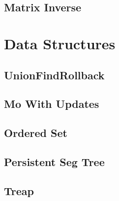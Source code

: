 \subsection{Matrix Inverse}
\vspace{-2.3ex}
\raggedbottom
\vspace{-3.3ex}
\hrulefill

\section{Data Structures}
\vspace{-1ex}
\subsection{UnionFindRollback}
\vspace{-2.3ex}
\raggedbottom
\vspace{-3.3ex}
\hrulefill
\vspace{-1ex}
\subsection{Mo With Updates}
\vspace{-2.3ex}
\raggedbottom
\vspace{-3.3ex}
\hrulefill
\vspace{-1ex}
\subsection{Ordered Set}
\vspace{-2.3ex}
\raggedbottom
\vspace{-3.3ex}
\hrulefill
\vspace{-1ex}
\subsection{Persistent Seg Tree}
\vspace{-2.3ex}
\raggedbottom
\vspace{-3.3ex}
\hrulefill
\vspace{-1ex}
\subsection{Treap}
\vspace{-2.3ex}
\raggedbottom
\vspace{-3.3ex}
\hrulefill
\vspace{-1ex}
